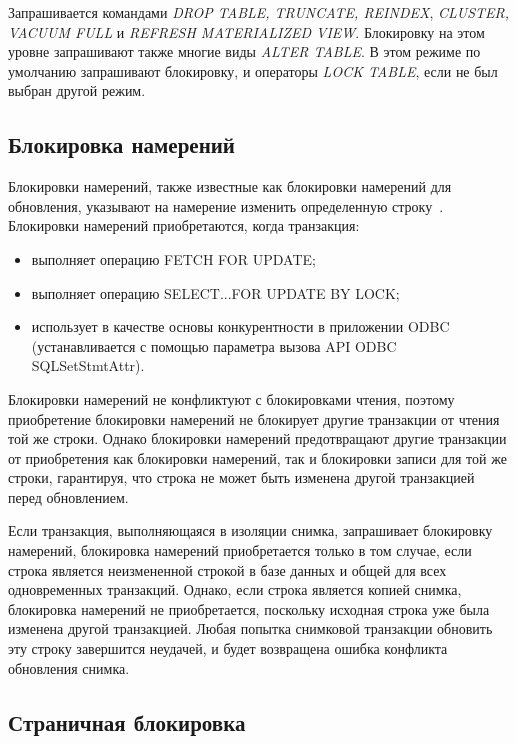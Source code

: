 Запрашивается командами \textit{DROP TABLE, TRUNCATE, REINDEX},  \textit{CLUSTER, VACUUM FULL} и \textit{REFRESH MATERIALIZED VIEW}. Блокировку на этом уровне запрашивают также многие виды \textit{ALTER TABLE}. 
В этом режиме по умолчанию запрашивают блокировку, и операторы \textit{LOCK TABLE}, если не был выбран другой режим.

\subsection{Блокировка намерений}

Блокировки намерений, также известные как блокировки намерений для обновления, указывают на намерение изменить определенную строку~\cite{intent_block}.
Блокировки намерений приобретаются, когда транзакция:

\begin{itemize}
	\item выполняет операцию FETCH FOR UPDATE;
	\item выполняет операцию SELECT...FOR UPDATE BY LOCK;
	\item использует  в качестве основы конкурентности в приложении ODBC (устанавливается с помощью параметра  вызова API ODBC SQLSetStmtAttr).
\end{itemize}

Блокировки намерений не конфликтуют с блокировками чтения, поэтому приобретение блокировки намерений не блокирует другие транзакции от чтения той же строки. 
Однако блокировки намерений предотвращают другие транзакции от приобретения как блокировки намерений, так и блокировки записи для той же строки, гарантируя, что строка не может быть изменена другой транзакцией перед обновлением.

Если транзакция, выполняющаяся в изоляции снимка, запрашивает блокировку намерений, блокировка намерений приобретается только в том случае, если строка является неизмененной строкой в базе данных и общей для всех одновременных транзакций. 
Однако, если строка является копией снимка, блокировка намерений не приобретается, поскольку исходная строка уже была изменена другой транзакцией. 
Любая попытка снимковой транзакции обновить эту строку завершится неудачей, и будет возвращена ошибка конфликта обновления снимка.

\subsection{Страничная блокировка}

